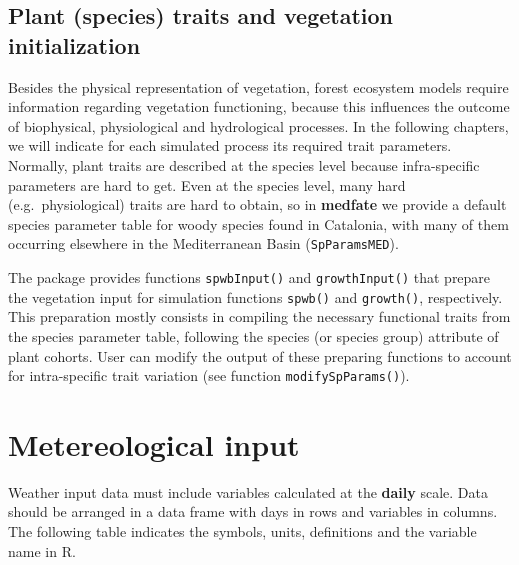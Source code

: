 \documentclass[]{book}
\begin{document}
\subsection{Plant (species) traits and vegetation
initialization}\label{plant-species-traits-and-vegetation-initialization}

Besides the physical representation of vegetation, forest ecosystem
models require information regarding vegetation functioning, because
this influences the outcome of biophysical, physiological and
hydrological processes. In the following chapters, we will indicate for
each simulated process its required trait parameters. Normally, plant
traits are described at the species level because infra-specific
parameters are hard to get. Even at the species level, many hard
(e.g.~physiological) traits are hard to obtain, so in \textbf{medfate}
we provide a default species parameter table for woody species found in
Catalonia, with many of them occurring elsewhere in the Mediterranean
Basin (\texttt{SpParamsMED}).

The package provides functions \texttt{spwbInput()} and
\texttt{growthInput()} that prepare the vegetation input for simulation
functions \texttt{spwb()} and \texttt{growth()}, respectively. This
preparation mostly consists in compiling the necessary functional traits
from the species parameter table, following the species (or species
group) attribute of plant cohorts. User can modify the output of these
preparing functions to account for intra-specific trait variation (see
function \texttt{modifySpParams()}).

\section{Metereological input}\label{meteoinput}

Weather input data must include variables calculated at the
\textbf{daily} scale. Data should be arranged in a data frame with days
in rows and variables in columns. The following table indicates the
symbols, units, definitions and the variable name in R.
\end{document}

